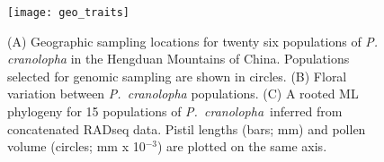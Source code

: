 \documentclass[12pt,letterpaper]{article}
\def\PC{\emph{P.~cranolopha}}
\def\P{\emph{Pedicularis}}
\begin{document}
\clearpage
\newpage

\begin{figure}
\centering
\texttt{[image: geo\_traits]}
\caption{(A) Geographic sampling locations for twenty six populations of 
\emph{P. cranolopha} in the Hengduan Mountains of China. 
Populations selected for genomic sampling are shown in circles. 
(B) Floral variation between \emph{P.~cranolopha} populations. 
(C) A rooted ML phylogeny for 15 populations of \PC~inferred from
concatenated RADseq data. Pistil lengths (bars; mm) and 
pollen volume (circles; mm x 10$^{-3}$) are plotted on the same axis.}
\label{fig:2}
\end{figure}


\clearpage
\newpage


\end{document}
